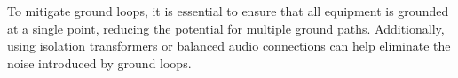 To mitigate ground loops, it is essential to ensure that all equipment is grounded at a single point, reducing the potential for multiple ground paths. Additionally, using isolation transformers or balanced audio connections can help eliminate the noise introduced by ground loops.

